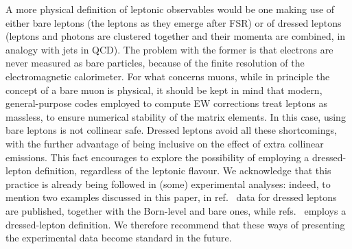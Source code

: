 A more physical definition of leptonic observables would be one making use of either bare leptons (the leptons as they emerge after FSR)
or of dressed leptons (leptons and photons are clustered together and their momenta are combined, in analogy with jets in QCD). The problem with the former is that 
electrons are never measured as bare particles, because of the finite resolution 
of the electromagnetic calorimeter. For what concerns muons, while in principle the concept of a bare muon is physical, it should be kept in
mind that modern, general-purpose codes employed to
compute EW corrections treat leptons as massless, to ensure numerical stability of the matrix elements. In this case, using bare leptons is not collinear safe.
Dressed leptons avoid all these shortcomings, with the further advantage of being
inclusive on the effect of extra collinear emissions. This fact encourages to explore the possibility of employing a dressed-lepton
definition, regardless of the leptonic flavour. We acknowledge that this practice is already being followed in (some) experimental analyses:
indeed, to mention two examples discussed in this paper, in ref.~\cite{Aad:2015auj} data for dressed leptons are published, together with the Born-level
and bare ones, while refs.~\cite{Sirunyan:2019bzr} employs a dressed-lepton definition. We therefore recommend that these ways of presenting the experimental
data become standard in the future. 

